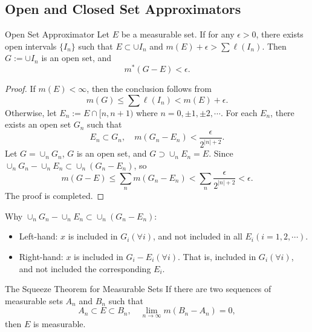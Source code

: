 \subsection{Open and Closed Set Approximators}

\begin{theorem}{Open Set Approximator}{}
  Let $E$ be a measurable set.
  If for any $\epsilon > 0$, there exists open intervals $\{I_n\}$ such that
  $E \subset \cup I_n$ and $m(E) + \epsilon > \sum \ell(I_n)$.
  Then $G := \cup I_n$ is an open set, and
  \begin{equation}
    m^{\ast}(G - E) < \epsilon.
  \end{equation}
\end{theorem}

\begin{proof}
  If $m(E) < \infty$, then the conclusion follows from
  \begin{equation}
    m(G) \leq \sum \ell(I_n) < m(E) + \epsilon.
  \end{equation}
  Otherwise, let $E_n := E \cap [n, n+1)$ where $n = 0, \pm 1, \pm 2, \cdots$.
  For each $E_n$, there exists an open set $G_n$ such that
  \begin{equation}
    E_n \subset G_n, \quad m(G_n - E_n) < \frac{\epsilon}{2^{|n| + 2}}.
  \end{equation}
  Let $G = \cup_n G_n$, $G$ is an open set, and $G \supset \cup _n E_n = E$.
  Since $\cup_n G_n - \cup_n E_n \subset \cup_n (G_n - E_n)$, so
  \begin{equation}
    m(G - E) \leq \sum _n m(G_n - E_n) < \sum_n \frac{\epsilon}{2^{|n| + 2}} < \epsilon.
  \end{equation}
  The proof is completed.
\end{proof}

\begin{note}
  Why $\cup_n G_n - \cup_n E_n \subset \cup_n (G_n - E_n)$:
  \begin{itemize}
  \item Left-hand: $x$ is included in $G_i(\forall i)$, and not included in all $E_i(i=1,2,\cdots)$.
  \item Right-hand: $x$ is included in $G_i - E_i(\forall i)$.
    That is, included in $G_i (\forall i)$, and not included the corresponding $E_i$.
  \end{itemize}
\end{note}

\begin{theorem}{The Squeeze Theorem for Measurable Sets}{}
  If there are two sequences of measurable sets $A_n$ and $B_n$ such that
  \begin{equation}
    A_n \subset E \subset B_n, \quad \lim \limits _{n \rightarrow \infty} m(B_n - A_n) = 0,
  \end{equation}
  then $E$ is measurable.
\end{theorem}

